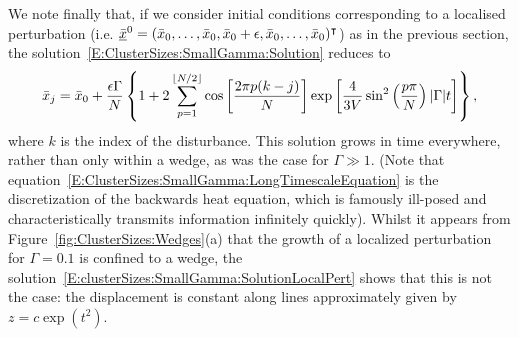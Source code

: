 We note finally that, if we consider initial conditions corresponding to a localised perturbation (i.e. $\underline{\bar{x}}^0  = (\bar{x}_0, \dots, \bar{x}_0, \bar{x}_0 + \epsilon, \bar{x}_0, \dots, \bar{x}_0)^\intercal$) as in the previous section, the solution~\eqref{E:ClusterSizes:SmallGamma:Solution} reduces to
\begin{equation}\label{E:clusterSizes:SmallGamma:SolutionLocalPert}
\bar{x}_{j} = \bar{x}_0 + \frac{\epsilon\Gamma}{N}\left\{1 + 2\sum_{p = 1}^{\lfloor N/2\rfloor} \cos\left[\frac{2\pi p (k-j)}{N}\right]\exp\left[\frac{4}{3V}\sin^2\left(\frac{p\pi}{N}\right)|\Gamma|t\right]\right\},
\end{equation}
where $k$ is the index of the disturbance. This solution grows in time everywhere, rather than only within a wedge, as was the case for $\Gamma \gg 1$. (Note that equation~\eqref{E:ClusterSizes:SmallGamma:LongTimescaleEquation} is the discretization of the backwards heat equation, which is famously ill-posed and characteristically transmits information infinitely quickly). Whilst it appears from Figure~\ref{fig:ClusterSizes:Wedges}(a) that the growth of a localized perturbation for $\Gamma = 0.1$ is confined to a wedge, the solution~\eqref{E:clusterSizes:SmallGamma:SolutionLocalPert} shows that this is not the case: the displacement is constant along lines approximately given by $z = c \exp(t^2)$.

